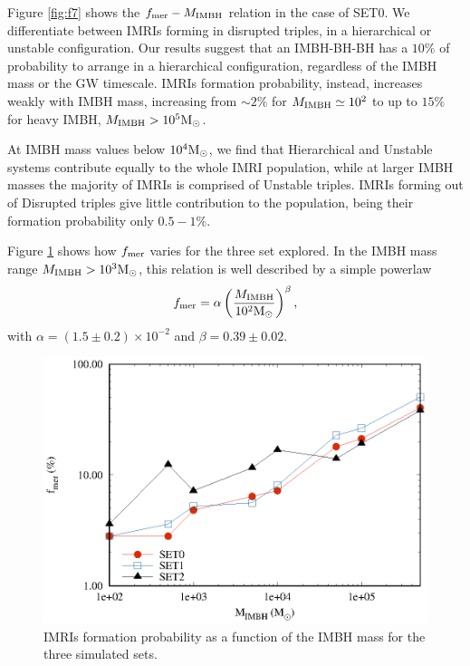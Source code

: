 \documentclass[twocolumn]{aastex62}
\newcommand{\Ms}{{\rm M}_\odot}
\newcommand{\ibh}{{\rm IMBH}}
\begin{document}
Figure \ref{fig:f7} shows the $f_{\rm mer}-M_\ibh$ relation in the case of SET0. We differentiate between IMRIs forming in disrupted triples, in a hierarchical or unstable configuration. 
Our results suggest that an IMBH-BH-BH has a $10\%$ of probability to arrange in a hierarchical configuration, regardless of the IMBH mass or the GW timescale. IMRIs formation probability, instead, increases weakly with IMBH mass, increasing from $\sim 2\%$ for $M_\ibh \simeq 10^2$ to up to $15\%$ for heavy IMBH, $M_\ibh>10^5\Ms$.

At IMBH mass values below $10^4\Ms$, we find that Hierarchical and Unstable systems contribute equally to the whole IMRI population, while at larger IMBH masses the majority of IMRIs is comprised of Unstable triples. IMRIs forming out of Disrupted triples give little contribution to the population, being their formation probability only $0.5-1\%$.

Figure \ref{fig:f8} shows how $f_{\rm mer}$ varies for the three set explored. In the IMBH mass range $M_\ibh>10^3\Ms$, this relation is well described by a simple powerlaw
\begin{equation}
f_{\rm mer} = \alpha \left(\frac{M_\ibh}{10^2\Ms}\right)^\beta,
\label{fmerg}
\end{equation}  
with $\alpha = (1.5\pm0.2)\times 10^{-2}$ and $\beta = 0.39\pm0.02$. 


\begin{figure}
    \centering
    \includegraphics[width=\columnwidth]{merger_sets.eps}
    \caption{IMRIs formation probability as a function of the IMBH mass for the three simulated sets.}
    \label{fig:f8}
\end{figure}
\end{document}
